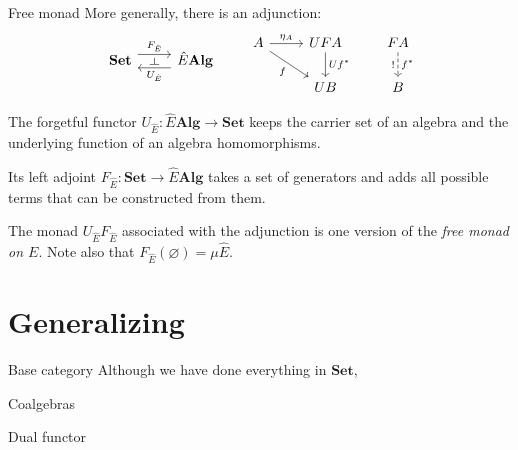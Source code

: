 \documentclass{beamer}
\newcommand{\cat}[1]{\mathbf{#1}}
\begin{document}
\begin{frame}[fragile]{Free monad} %
More generally, there is an adjunction:
\[
  \begin{tikzcd}
    \cat{Set}
    \arrow[r, "F_{\hat{E}}" name=F, shift left=2] &
    \hat{E} \cat{Alg}
    \arrow[l, "U_{\hat{E}}" name=G, shift left=2]
    \arrow[phantom, from=F, to=G, "\dashv" rotate=-90]
  \end{tikzcd}
  \qquad
  \begin{tikzcd}
    A \arrow[r, "\eta_A"] \arrow[rd, "f"'] &
    UFA \arrow[d, "U f^*"] &
    FA \arrow[d, "f^*", "!"', dashed] \\
    & U B & B
  \end{tikzcd}
\]
\pause

The forgetful functor
$U_{\hat{E}} : \hat{E} \cat{Alg} \rightarrow \cat{Set}$
keeps the carrier set of an algebra
and the underlying function of an algebra homomorphisms.
\pause

Its left adjoint
$F_{\hat{E}} : \cat{Set} \rightarrow \hat{E} \cat{Alg}$
takes a set of generators
and adds all possible terms that can be constructed from them.
\pause

The monad $U_{\hat{E}} F_{\hat{E}}$
associated with the adjunction
is one version of the \emph{free monad on $E$}.
Note also that $F_{\hat{E}}(\varnothing) = \mu \hat{E}$.
\end{frame}

\section{Generalizing}

\begin{frame}{Base category}
Although we have done everything in $\cat{Set}$,

\end{frame}

\begin{frame}{Coalgebras}
\end{frame}

\begin{frame}{Dual functor}
\end{frame}
\end{document}
